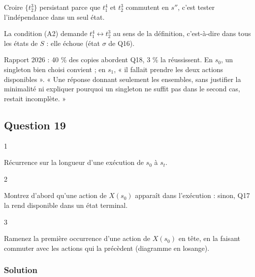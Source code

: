 \documentclass[11pt,a4paper]{article}
\begin{document}
\begin{piege}

Croire \(\{t_2^3\}\) persistant parce que \(t_1^4\) et \(t_2^3\) commutent en \(s''\), c'est tester l'indépendance dans un seul état.

La condition (A2) demande \(t_1^4\leftrightarrow t_2^3\) au sens de la définition, c'est-à-dire dans tous les états de \(S\) : elle échoue (état \(\sigma\) de Q16).

\end{piege}

\begin{jury}

Rapport 2026 : 40 \% des copies abordent Q18, 3 \% la réussissent. En \(s_0\), un singleton bien choisi convient ; en \(s_1\), « il fallait prendre les deux actions disponibles ». « Une réponse donnant seulement les ensembles, sans justifier la minimalité ni expliquer pourquoi un singleton ne suffit pas dans le second cas, restait incomplète. »

\end{jury}

\hypertarget{question-19}{%
\subsection{Question 19}\label{question-19}}

\begin{indication}{1}

Récurrence sur la longueur d'une exécution de \(s_0\) à \(s_t\).

\end{indication}

\begin{indication}{2}

Montrez d'abord qu'une action de \(X(s_0)\) apparaît dans l'exécution : sinon, Q17 la rend disponible dans un état terminal.

\end{indication}

\begin{indication}{3}

Ramenez la première occurrence d'une action de \(X(s_0)\) en tête, en la faisant commuter avec les actions qui la précèdent (diagramme en losange).

\end{indication}

\hypertarget{solution-18}{%
\subsubsection{Solution}\label{solution-18}}
\end{document}
